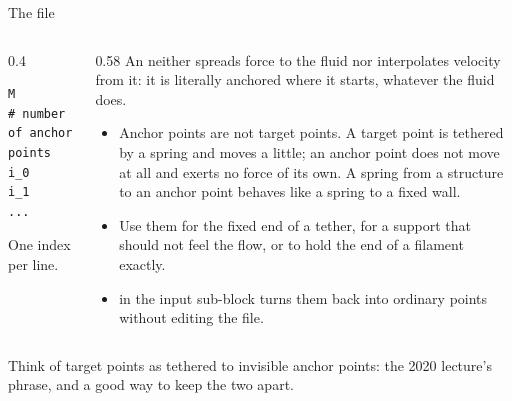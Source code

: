 \documentclass[aspectratio=169,11pt]{beamer}
\begin{document}
\begin{frame}[fragile]{The  file}
\begin{columns}[T,onlytextwidth]
\begin{column}{0.4\textwidth}
\begin{lstlisting}[style=data]
M        # number of anchor points
i_0
i_1
...
\end{lstlisting}
\small One index per line.
\end{column}
\begin{column}{0.58\textwidth}
\footnotesize An  neither spreads force to the fluid nor interpolates velocity from it: it is literally anchored where it starts, whatever the fluid does.
\begin{itemize}
  \item Anchor points are not target points. A target point is tethered by a spring and moves a little; an anchor point does not move at all and exerts no force of its own. A spring from a structure to an anchor point behaves like a spring to a fixed wall.
  \item Use them for the fixed end of a tether, for a support that should not feel the flow, or to hold the end of a filament exactly.
  \item {} in the input sub-block turns them back into ordinary points without editing the file.
\end{itemize}
\end{column}
\end{columns}
\vspace{1mm}
\begin{punchbox}
\small Think of target points as tethered to invisible anchor points: the 2020 lecture's phrase, and a good way to keep the two apart.
\end{punchbox}
\end{frame}
\end{document}
